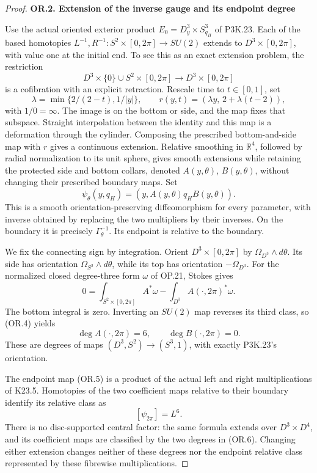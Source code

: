 \begin{proof}
\par

\medskip\noindent\textbf{OR.2. Extension of the inverse gauge and its endpoint degree}

\par\nobreak

Use the actual oriented exterior product
\(E_0=D^3_y\times S^3_{q_H}\) of P3K.23. Each of the based
homotopies \(L^{-1},R^{-1}:S^2\times[0,2\pi]\to SU(2)\)
extends to \(D^3\times[0,2\pi]\), with value one at the initial
end. To see this as an exact extension problem, the restriction
\[
 D^3\times\{0\}\cup S^2\times[0,2\pi]
                    \longrightarrow D^3\times[0,2\pi]
\]
is a cofibration with an explicit retraction. Rescale time to
\(t\in[0,1]\), set
\[
 \lambda=\min\{2/(2-t),1/|y|\},\qquad
 r(y,t)=(\lambda y,\,2+\lambda(t-2)),
\]
with \(1/0=\infty\). The image is on the bottom or side, and the
map fixes that subspace. Straight interpolation between the identity
and this map is a deformation through the cylinder. Composing the
prescribed bottom-and-side map with \(r\) gives a continuous
extension. Relative smoothing in \(\mathbb R^4\), followed by
radial normalization to its unit sphere, gives smooth extensions
while retaining the protected side and bottom collars, denoted
\(A(y,\theta)\), \(B(y,\theta)\), without changing their prescribed
boundary maps. Set
\[
 \psi_\theta(y,q_H)=
       (y,A(y,\theta)q_HB(y,\theta)).                \tag{OR.5}
\]
This is a smooth orientation-preserving diffeomorphism for every
parameter, with inverse obtained by replacing the two multipliers
by their inverses. On the boundary it is precisely
\(\Gamma_\theta^{-1}\). Its endpoint is relative to the boundary.

We fix the connecting sign by integration. Orient
\(D^3\times[0,2\pi]\) by \(\Omega_{D^3}\wedge d\theta\).
Its side has orientation \(\Omega_{S^2}\wedge d\theta\), while
its top has orientation \(-\Omega_{D^3}\). For the normalized
closed degree-three form \(\omega\) of OP.21, Stokes gives
\[
 0=\int_{S^2\times[0,2\pi]}A^*\omega
                    -\int_{D^3}A(\cdot,2\pi)^*\omega.
\]
The bottom integral is zero. Inverting an \(SU(2)\) map reverses
its third class, so (OR.4) yields
\[
 \deg A(\cdot,2\pi)=6,\qquad
 \deg B(\cdot,2\pi)=0.                               \tag{OR.6}
\]
These are degrees of maps \((D^3,S^2)\to(S^3,1)\), with exactly
P3K.23's orientation.

The endpoint map (OR.5) is a product of the actual left and right
multiplications of K23.5. Homotopies of the two coefficient maps
relative to their boundary identify its relative class as
\[
                         [\psi_{2\pi}]=L^6.           \tag{OR.7}
\]
There is no disc-supported central factor: the same formula extends
over \(D^3\times D^4\), and its coefficient maps are classified by
the two degrees in (OR.6). Changing either extension changes neither
of these degrees nor the endpoint relative class represented by
these fibrewise multiplications.


\end{proof}
